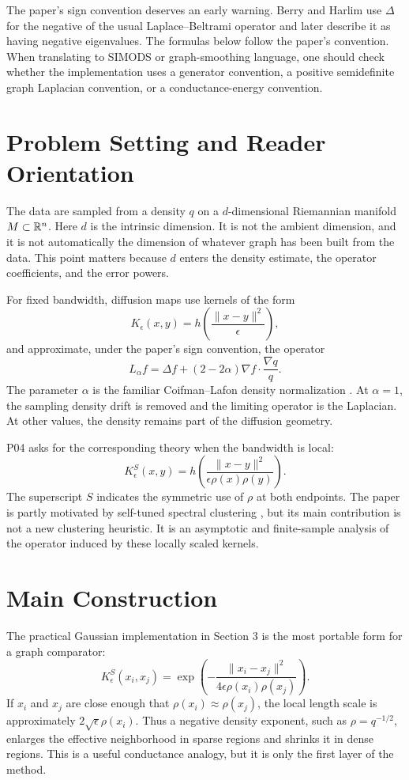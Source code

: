 \documentclass[11pt]{article}
\begin{document}
The paper's sign convention deserves an early warning.  Berry and Harlim use
\(\Delta\) for the negative of the usual Laplace--Beltrami operator and later
describe it as having negative eigenvalues.  The formulas below follow the
paper's convention.  When translating to SIMODS or graph-smoothing language,
one should check whether the implementation uses a generator convention,
a positive semidefinite graph Laplacian convention, or a conductance-energy
convention.

\section{Problem Setting and Reader Orientation}

The data are sampled from a density \(q\) on a \(d\)-dimensional Riemannian
manifold \(M\subset \mathbb{R}^n\).  Here \(d\) is the intrinsic dimension.  It is not
the ambient dimension, and it is not automatically the dimension of whatever
graph has been built from the data.  This point matters because \(d\) enters
the density estimate, the operator coefficients, and the error powers.

For fixed bandwidth, diffusion maps use kernels of the form
\[
  K_\epsilon(x,y)=h\!\left(\frac{\|x-y\|^2}{\epsilon}\right),
\]
and approximate, under the paper's sign convention, the operator
\[
  L_\alpha f
  = \Delta f + (2-2\alpha)\nabla f\cdot\frac{\nabla q}{q}.
\]
The parameter \(\alpha\) is the familiar Coifman--Lafon density
normalization \citep{coifman2006diffusion}.  At \(\alpha=1\), the sampling
density drift is removed and the limiting operator is the Laplacian.  At other
values, the density remains part of the diffusion geometry.

P04 asks for the corresponding theory when the bandwidth is local:
\[
  K_\epsilon^S(x,y)
  =
  h\!\left(\frac{\|x-y\|^2}{\epsilon\rho(x)\rho(y)}\right).
\]
The superscript \(S\) indicates the symmetric use of \(\rho\) at both endpoints.
The paper is partly motivated by self-tuned spectral clustering
\citep{zelnikmanor2004selftuning}, but its main contribution is not a new
clustering heuristic.  It is an asymptotic and finite-sample analysis of the
operator induced by these locally scaled kernels.

\section{Main Construction}

The practical Gaussian implementation in Section 3 is the most portable form
for a graph comparator:
\[
  K_\epsilon^S(x_i,x_j)
  =
  \exp\!\left(
    -\frac{\|x_i-x_j\|^2}{4\epsilon\rho(x_i)\rho(x_j)}
  \right).
\]
If \(x_i\) and \(x_j\) are close enough that
\(\rho(x_i)\approx\rho(x_j)\), the local length scale is approximately
\(2\sqrt{\epsilon}\rho(x_i)\).  Thus a negative density exponent, such as
\(\rho=q^{-1/2}\), enlarges the effective neighborhood in sparse regions and
shrinks it in dense regions.  This is a useful conductance analogy, but it is
only the first layer of the method.
\end{document}
